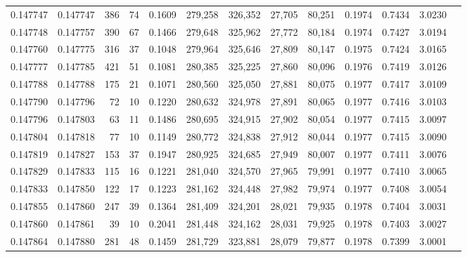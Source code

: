 \begin{tabular}{rrrrrrrrrrrrr}
0.147747 & 0.147747 &   386 &  74 &                                     0.1609 & 279,258 & 326,352 &  27,705 &  80,251 & 0.1974 & 0.7434 & 3.0230 \\
0.147748 & 0.147757 &   390 &  67 &                                     0.1466 & 279,648 & 325,962 &  27,772 &  80,184 & 0.1974 & 0.7427 & 3.0194 \\
0.147760 & 0.147775 &   316 &  37 &                                     0.1048 & 279,964 & 325,646 &  27,809 &  80,147 & 0.1975 & 0.7424 & 3.0165 \\
0.147777 & 0.147785 &   421 &  51 &                                     0.1081 & 280,385 & 325,225 &  27,860 &  80,096 & 0.1976 & 0.7419 & 3.0126 \\
0.147788 & 0.147788 &   175 &  21 &                                     0.1071 & 280,560 & 325,050 &  27,881 &  80,075 & 0.1977 & 0.7417 & 3.0109 \\
0.147790 & 0.147796 &    72 &  10 &                                     0.1220 & 280,632 & 324,978 &  27,891 &  80,065 & 0.1977 & 0.7416 & 3.0103 \\
0.147796 & 0.147803 &    63 &  11 &                                     0.1486 & 280,695 & 324,915 &  27,902 &  80,054 & 0.1977 & 0.7415 & 3.0097 \\
0.147804 & 0.147818 &    77 &  10 &                                     0.1149 & 280,772 & 324,838 &  27,912 &  80,044 & 0.1977 & 0.7415 & 3.0090 \\
0.147819 & 0.147827 &   153 &  37 &                                     0.1947 & 280,925 & 324,685 &  27,949 &  80,007 & 0.1977 & 0.7411 & 3.0076 \\
0.147829 & 0.147833 &   115 &  16 &                                     0.1221 & 281,040 & 324,570 &  27,965 &  79,991 & 0.1977 & 0.7410 & 3.0065 \\
0.147833 & 0.147850 &   122 &  17 &                                     0.1223 & 281,162 & 324,448 &  27,982 &  79,974 & 0.1977 & 0.7408 & 3.0054 \\
0.147855 & 0.147860 &   247 &  39 &                                     0.1364 & 281,409 & 324,201 &  28,021 &  79,935 & 0.1978 & 0.7404 & 3.0031 \\
0.147860 & 0.147861 &    39 &  10 &                                     0.2041 & 281,448 & 324,162 &  28,031 &  79,925 & 0.1978 & 0.7403 & 3.0027 \\
0.147864 & 0.147880 &   281 &  48 &                                     0.1459 & 281,729 & 323,881 &  28,079 &  79,877 & 0.1978 & 0.7399 & 3.0001 \\

\end{tabular}
